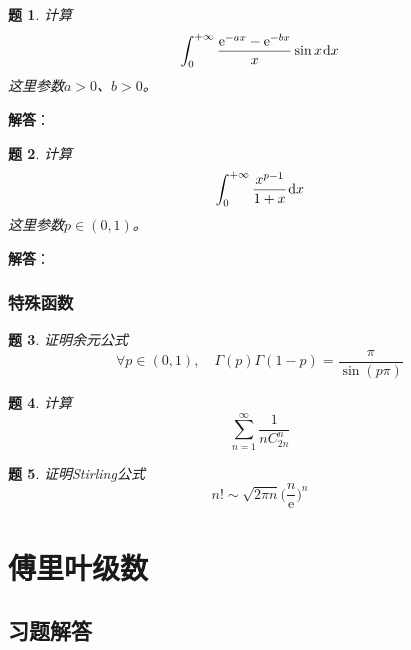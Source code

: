 \documentclass[a4paper,UTF8,fontset=windows,AutoFakeBold]{ctexart}
\newcommand*{\dr}{\hspace{0.07em}\mathrm{d}}
\newcommand*{\er}{\mathrm{e}}
\newcommand*{\suminf}[1][n=1]{\sum_{#1}^\infty}
\theoremstyle{ex}
\newtheorem{exercise}{题}
\newcommand{\sol}[1]{{\vspace{5pt}\kaishu\noindent\textbf{解答}：\vspace{-3pt}
\begin{compactitem}
    \item[] #1
\end{compactitem}
}}
\begin{document}
\begin{framed}
\begin{exercise}
    计算
    $$\int_0^{+\infty}\frac{\er^{-ax}-\er^{-bx}}{x}\sin x\dr x$$
    这里参数$a>0$、$b>0$。
\end{exercise}
\sol{

}
\end{framed}

\begin{framed}
\begin{exercise}
    计算
    $$\int_0^{+\infty}\frac{x^{p-1}}{1+x}\dr x$$
    这里参数$p\in(0,1)$。
\end{exercise}
\sol{

}
\end{framed}

\subsubsection{特殊函数}
\begin{framed}
\begin{exercise}
    证明余元公式
    $$\forall p\in(0,1),\quad\Gamma(p)\Gamma(1-p)=\frac{\pi}{\sin(p\pi)}$$
\end{exercise}
\end{framed}

\begin{framed}
\begin{exercise}
    计算
    $$\suminf\frac{1}{nC_{2n}^n}$$
\end{exercise}
\end{framed}

\begin{framed}
\begin{exercise}
    证明Stirling公式
    $$n!\sim\sqrt{2\pi n}\bigg(\frac{n}{\er}\bigg)^n$$
\end{exercise}
\end{framed}

\newpage
\section{傅里叶级数}
\subsection{习题解答}
\end{document}
